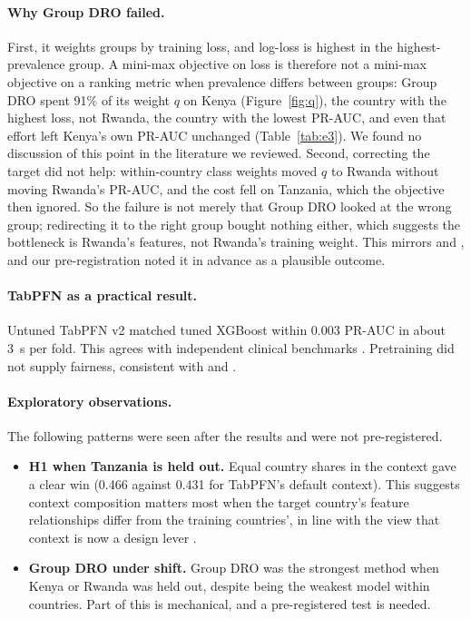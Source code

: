 \documentclass[11pt]{article}
\begin{document}
\paragraph{Why Group DRO failed.} First, it weights groups by training loss, and log-loss is highest in the highest-prevalence group. A mini-max objective on loss is therefore not a mini-max objective on a ranking metric when prevalence differs between groups: Group DRO spent 91\% of its weight $q$ on Kenya (Figure~\ref{fig:q}), the country with the highest loss, not Rwanda, the country with the lowest PR-AUC, and even that effort left Kenya's own PR-AUC unchanged (Table~\ref{tab:e3}). We found no discussion of this point in the literature we reviewed. Second, correcting the target did not help: within-country class weights moved $q$ to Rwanda without moving Rwanda's PR-AUC, and the cost fell on Tanzania, which the objective then ignored. So the failure is not merely that Group DRO looked at the wrong group; redirecting it to the right group bought nothing either, which suggests the bottleneck is Rwanda's features, not Rwanda's training weight. This mirrors \citet{koh2021wilds} and \citet{stahlschmidt2024domain}, and our pre-registration noted it in advance as a plausible outcome.

\paragraph{TabPFN as a practical result.} Untuned TabPFN v2 matched tuned XGBoost within 0.003 PR-AUC in about 3~s per fold. This agrees with independent clinical benchmarks \citep{shaktah2026established}. Pretraining did not supply fairness, consistent with \citet{liu2026causal} and \citet[pp.~22--23]{kurashkin2026current}.

\paragraph{Exploratory observations.} The following patterns were seen after the results and were not pre-registered.
\begin{itemize}
  \item \textbf{H1 when Tanzania is held out.} Equal country shares in the context gave a clear win (0.466 against 0.431 for TabPFN's default context). This suggests context composition matters most when the target country's feature relationships differ from the training countries', in line with the view that context is now a design lever \citep[p.~19]{kurashkin2026current}.
  \item \textbf{Group DRO under shift.} Group DRO was the strongest method when Kenya or Rwanda was held out, despite being the weakest model within countries. Part of this is mechanical, and a pre-registered test is needed.
\end{itemize}
\end{document}
